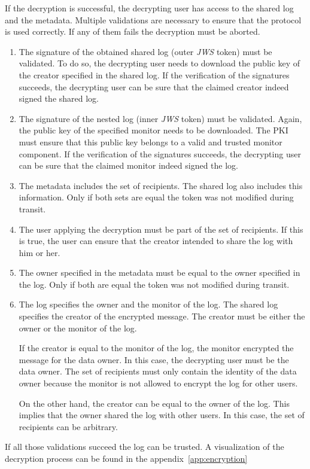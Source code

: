 \documentclass[../main.tex]{subfiles}
\begin{document}
If the decryption is successful, the decrypting user has access to the shared log and the metadata.
Multiple validations are necessary to ensure that the protocol is used correctly.
If any of them fails the decryption must be aborted.
\begin{enumerate}
    \item 
    The signature of the obtained shared log (outer \emph{JWS} token) must be validated.
    To do so, the decrypting user needs to download the public key of the creator specified in the shared log.
    If the verification of the signatures succeeds, the decrypting user can be sure that the claimed creator indeed signed the shared log.
    \item
    The signature of the nested log (inner \emph{JWS} token) must be validated.
    Again, the public key of the specified monitor needs to be downloaded.
    The PKI must ensure that this public key belongs to a valid and trusted monitor component.
    If the verification of the signatures succeeds, the decrypting user can be sure that the claimed monitor indeed signed the log.
    \item
    The metadata includes the set of recipients.
    The shared log also includes this information.
    Only if both sets are equal the token was not modified during transit.
    \item
    The user applying the decryption must be part of the set of recipients.
    If this is true, the user can ensure that the creator intended to share the log with him or her.
    \item
    The owner specified in the metadata must be equal to the owner specified in the log.
    Only if both are equal the token was not modified during transit.
    \item
    The log specifies the owner and the monitor of the log.
    The shared log specifies the creator of the encrypted message.
    The creator must be either the owner or the monitor of the log.
    
    If the creator is equal to the monitor of the log, the monitor encrypted the message for the data owner.
    In this case, the decrypting user must be the data owner.
    The set of recipients must only contain the identity of the data owner because the monitor is not allowed to encrypt the log for other users.

    On the other hand, the creator can be equal to the owner of the log.
    This implies that the owner shared the log with other users.
    In this case, the set of recipients can be arbitrary.
\end{enumerate}
If all those validations succeed the log can be trusted.
A visualization of the decryption process can be found in the appendix~\ref{app:encryption}
\end{document}
